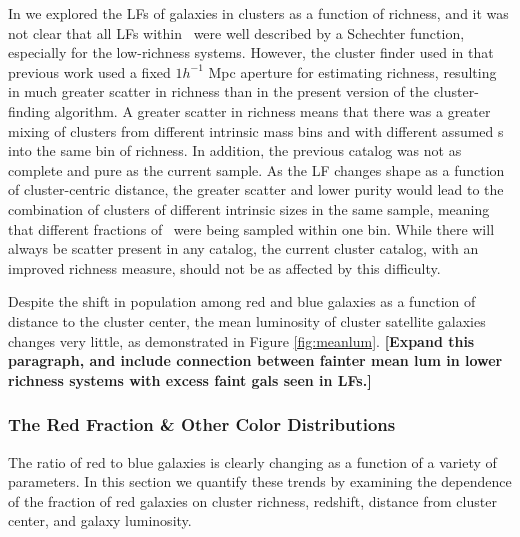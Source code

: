 \documentclass{emulateapj}
\begin{document}
In \citet{Hansen05} we explored the LFs of galaxies in clusters as a
function of richness, and it was not clear that all LFs within \rtwo\
were well described by a Schechter function, especially for the
low-richness systems. However, the cluster finder used in that
previous work used a fixed $1 h^{-1}$ Mpc aperture for estimating
richness, resulting in much greater scatter in richness than in the
present version of the cluster-finding algorithm. A greater scatter in
richness means that there was a greater mixing of clusters from
different intrinsic mass bins and with different assumed \rtwo s into
the same bin of richness. In addition, the previous catalog was not as
complete and pure as the current sample. As the LF
changes shape as a function of cluster-centric distance, the greater
scatter and lower purity would lead to the combination of clusters of
different intrinsic sizes in the same sample, meaning that different
fractions of \rtwo\ were being sampled within one bin. While there
will always be scatter present in any catalog, the current cluster
catalog, with an improved richness measure, should not be as affected
by this difficulty.

Despite the shift in population among red and blue galaxies as a
function of distance to the cluster center, the mean luminosity of
cluster satellite galaxies changes very little, as
demonstrated in Figure \ref{fig:meanlum}. {\bf[Expand this paragraph, and include connection between fainter mean lum in lower richness systems with excess faint gals seen in LFs.]}

\begin{figure*}
\end{figure*}


\subsubsection{The Red Fraction \& Other Color Distributions}\label{sec:BF}
The ratio of red to blue galaxies is clearly changing as a function of a variety of parameters. In this section we quantify these trends by examining the dependence of the fraction of red galaxies on cluster richness, redshift, distance from cluster center, and galaxy luminosity.
\end{document}
